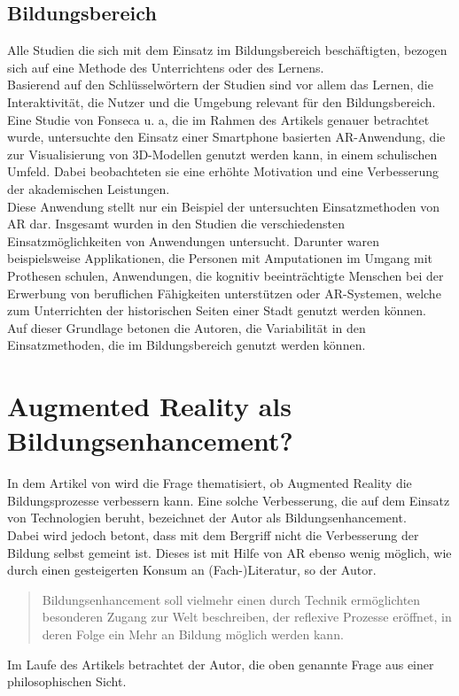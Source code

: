 \subsection{Bildungsbereich}
Alle Studien die sich mit dem Einsatz im Bildungsbereich beschäftigten, bezogen sich auf eine Methode des Unterrichtens oder des Lernens.\\ Basierend auf den Schlüsselwörtern der Studien sind vor allem das Lernen, die Interaktivität, die Nutzer und die Umgebung relevant für den Bildungsbereich.\\
Eine Studie von Fonseca u. a, die im Rahmen des Artikels genauer betrachtet wurde, untersuchte den Einsatz einer Smartphone basierten AR-Anwendung, die zur Visualisierung von 3D-Modellen genutzt werden kann, in einem schulischen Umfeld. Dabei beobachteten sie eine erhöhte Motivation und eine Verbesserung der akademischen Leistungen. \\
Diese Anwendung stellt nur ein Beispiel der untersuchten Einsatzmethoden von AR dar. Insgesamt wurden in den Studien die verschiedensten Einsatzmöglichkeiten von Anwendungen untersucht. Darunter waren beispielsweise Applikationen, die Personen mit Amputationen im Umgang mit Prothesen schulen, Anwendungen, die kognitiv beeinträchtigte Menschen bei der Erwerbung von beruflichen Fähigkeiten unterstützen oder AR-Systemen, welche zum Unterrichten der historischen Seiten einer Stadt genutzt werden können. \\
Auf dieser Grundlage betonen die Autoren, die Variabilität in den Einsatzmethoden, die im Bildungsbereich genutzt werden können.


\section{Augmented Reality als Bildungsenhancement?}
In dem Artikel \citep{damberger:ar-bildungsenhancement} von \citeauthor{damberger:ar-bildungsenhancement} wird die Frage thematisiert, ob Augmented Reality die Bildungsprozesse verbessern kann. Eine solche Verbesserung, die auf dem Einsatz von Technologien beruht, bezeichnet der Autor als Bildungsenhancement. \\
Dabei wird jedoch betont, dass mit dem Bergriff nicht die Verbesserung der Bildung selbst gemeint ist. Dieses ist mit Hilfe von AR ebenso wenig möglich, wie durch einen gesteigerten Konsum an (Fach-)Literatur, so der Autor.
\begin{quote}
\glqq Bildungsenhancement soll vielmehr einen durch Technik ermöglichten besonderen Zugang zur Welt beschreiben, der reflexive Prozesse eröffnet, in deren Folge ein Mehr an Bildung möglich werden kann.\grqq 
\end{quote}
Im Laufe des Artikels betrachtet der Autor, die oben genannte Frage aus einer philosophischen Sicht.

